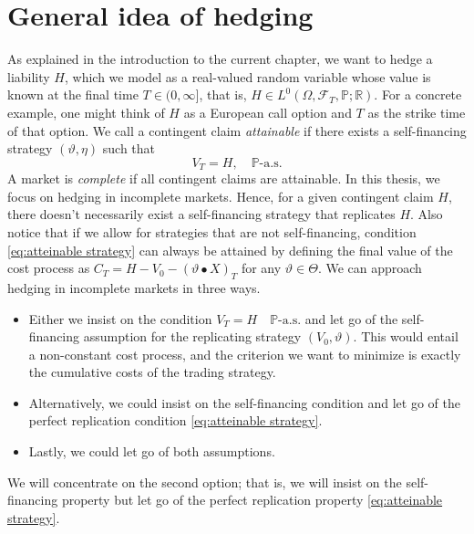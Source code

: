 \documentclass[11pt,a4paper,twoside,openany]{report}
\numberwithin{equation}{section}
\theoremstyle{plain} %
\theoremstyle{definition} %
\theoremstyle{remark} %
\begin{document}
\section{General idea of hedging}\label{sec:general idea of hedging}
As explained in the introduction to the current chapter, we want to hedge a liability \(H\), which we model as a real-valued random variable whose value is known at the final time \(T\in (0,\infty]\), that is, \(H\in L^0(\Omega,\mathcal{F}_T,\mathbb{P};\mathbb{R})\). For a concrete example, one might think of \(H\) as a European call option and \(T\) as the strike time of that option.
We call a contingent claim \textit{attainable} if there exists a self-financing strategy \((\vartheta,\eta)\) such that
\begin{equation}\label{eq:atteinable strategy}
    V_T = H,\quad \mathbb{P}\text{-a.s.}
\end{equation}
A market is \textit{complete} if all contingent claims are attainable. In this thesis, we focus on hedging in incomplete markets. Hence, for a given contingent claim \(H\), there doesn't necessarily exist a self-financing strategy that replicates \(H\). Also notice that if we allow for strategies that are not self-financing, condition \eqref{eq:atteinable strategy} can always be attained by defining the final value of the cost process as \(C_T=H-V_0-(\vartheta\bullet X)_T\) for any \(\vartheta\in\Theta\). We can approach hedging in incomplete markets in three ways.
\begin{itemize}
    \item Either we insist on the condition \(V_T = H\quad\mathbb{P}\text{-a.s.}\) and let go of the self-financing assumption for the replicating strategy \((V_0,\vartheta)\). This would entail a non-constant cost process, and the criterion we want to minimize is exactly the cumulative costs of the trading strategy.
    \item Alternatively, we could insist on the self-financing condition and let go of the perfect replication condition \eqref{eq:atteinable strategy}.
    \item Lastly, we could let go of both assumptions.
\end{itemize}
We will concentrate on the second option; that is, we will insist on the self-financing property but let go of the perfect replication property \eqref{eq:atteinable strategy}. 
\end{document}
